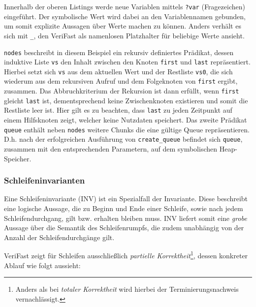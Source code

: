 \noindent
Innerhalb der oberen Listings werde neue Variablen mittels \texttt{?var} (Fragezeichen) eingeführt. Der symbolische Wert wird dabei an den Variablennamen gebunden, um somit explizite Aussagen über Werte machen zu können. Anders verhält es sich mit \texttt{\_}, den VeriFast als namenlosen Platzhalter für beliebige Werte ansieht. \cite{Jacobs2017}

\texttt{nodes} beschreibt in diesem Beispiel ein rekursiv definiertes Prädikat, dessen induktive Liste \texttt{vs} den Inhalt zwischen den Knoten \texttt{first} und \texttt{last} repräsentiert. Hierbei setzt sich \texttt{vs} aus dem aktuellen Wert und der Restliste \texttt{vs0}, die sich wiederum aus dem rekursiven Aufruf und dem Folgeknoten von \texttt{first} ergibt, zusammen. Das Abbruchkriterium der Rekursion ist dann erfüllt, wenn \texttt{first} gleicht \texttt{last} ist, dementsprechend keine Zwischenknoten existieren und somit die Restliste leer ist. Hier gilt es zu beachten, dass \texttt{last} zu jeden Zeitpunkt auf einem Hilfsknoten zeigt, welcher keine Nutzdaten speichert. Das zweite Prädikat \texttt{queue} enthält neben \texttt{nodes} weitere Chunks die eine gültige Queue repräsentieren. D.h. nach der erfolgreichen Ausführung von \texttt{create\_queue} befindet sich \texttt{queue}, zusammen mit den entsprechenden Parametern, auf dem symbolischen Heap-Speicher.

\subsubsection{Schleifeninvarianten}

Eine Schleifeninvariante (INV) ist ein Spezialfall der Invariante. Diese beschreibt eine logische Aussage, die zu Beginn und Ende einer Schleife, sowie nach jedem Schleifendurchgang, gilt bzw. erhalten bleiben muss. INV liefert somit eine \emph{grobe} Aussage über die Semantik des Schleifenrumpfs, die zudem unabhängig von der Anzahl der Schleifendurchgänge gilt.

VeriFast zeigt für Schleifen ausschließlich \emph{partielle Korrektheit}\footnote{Anders als bei \emph{totaler Korrektheit} wird hierbei der Terminierungsnachweis vernachlässigt.}, dessen konkreter Ablauf wie folgt aussieht: \cite{Jacobs2017}

